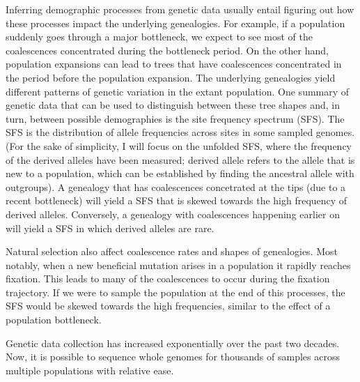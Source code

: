 Inferring demographic processes from genetic data usually entail figuring out how these processes impact the underlying genealogies.
For example, if a population suddenly goes through a major bottleneck, we expect to see most of the coalescences concentrated during the bottleneck period.
On the other hand, population expansions can lead to trees that have coalescences concentrated in the period before the population expansion.
The underlying genealogies yield different patterns of genetic variation in the extant population.
One summary of genetic data that can be used to distinguish between these tree shapes and, in turn, between possible demographies is the site frequency spectrum (SFS).
The SFS is the distribution of allele frequencies across sites in some sampled genomes.
(For the sake of simplicity, I will focus on the unfolded SFS, where the frequency of the derived alleles have been measured; derived allele refers to the allele that is new to a population, which can be established by finding the ancestral allele with outgroups).
A genealogy that has coalescences concetrated at the tips (due to a recent bottleneck) will yield a SFS that is skewed towards the high frequency of derived alleles.
Conversely, a genealogy with coalescences happening earlier on will yield a SFS in which derived alleles are rare.

Natural selection also affect coalescence rates and shapes of genealogies.
Most notably, when a new beneficial mutation arises in a population it rapidly reaches fixation.
This leads to many of the coalescences to occur during the fixation trajectory.
If we were to sample the population at the end of this processes,
the SFS would be skewed towards the high frequencies, similar to the effect of a population bottleneck.




Genetic data collection has increased exponentially over the past two decades.
Now, it is possible to sequence whole genomes for thousands of samples across multiple populations with relative ease.






